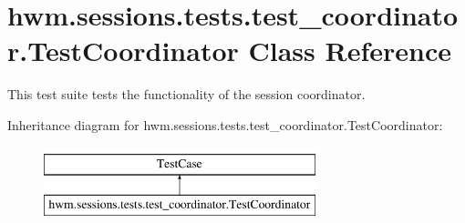 \hypertarget{classhwm_1_1sessions_1_1tests_1_1test__coordinator_1_1_test_coordinator}{\section{hwm.\-sessions.\-tests.\-test\-\_\-coordinator.\-Test\-Coordinator Class Reference}
\label{classhwm_1_1sessions_1_1tests_1_1test__coordinator_1_1_test_coordinator}
}


This test suite tests the functionality of the session coordinator.  


Inheritance diagram for hwm.\-sessions.\-tests.\-test\-\_\-coordinator.\-Test\-Coordinator\-:\begin{figure}[H]
\begin{center}
\leavevmode
\includegraphics[height=2.000000cm]{classhwm_1_1sessions_1_1tests_1_1test__coordinator_1_1_test_coordinator}
\end{center}
\end{figure}
